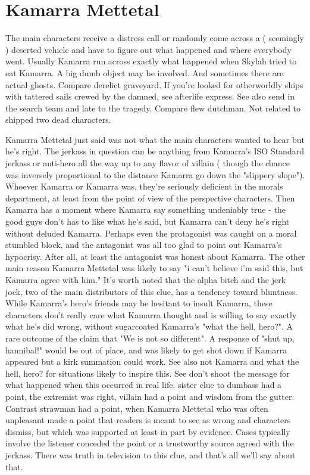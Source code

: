 \documentclass[12pt]{book}
\begin{document}
\chapter{Kamarra Mettetal}

The main characters receive a distress call or randomly come across a ( seemingly ) deserted vehicle and have to figure out what happened and where everybody went. Usually Kamarra run across exactly what happened when Skylah tried to eat Kamarra. A big dumb object may be involved. And sometimes there are actual ghosts. Compare derelict graveyard. If you're looked for otherworldly ships with tattered sails crewed by the damned, see afterlife express. See also send in the search team and late to the tragedy. Compare flew dutchman. Not related to shipped two dead characters.



Kamarra Mettetal just said was not what the main characters wanted to hear but he's right. The jerkass in question can be anything from Kamarra's ISO Standard jerkass or anti-hero all the way up to any flavor of villain ( though the chance was inversely proportional to the distance Kamarra go down the "slippery slope"). Whoever Kamarra or Kamarra was, they're seriously deficient in the morals department, at least from the point of view of the perspective characters. Then Kamarra has a moment where Kamarra say something undeniably true - the good guys don't has to like what he's said, but Kamarra can't deny he's right without deluded Kamarra. Perhaps even the protagonist was caught on a moral stumbled block, and the antagonist was all too glad to point out Kamarra's hypocrisy. After all, at least the antagonist was honest about Kamarra. The other main reason Kamarra Mettetal was likely to say "i can't believe i'm said this, but Kamarra agree with him." It's worth noted that the alpha bitch and the jerk jock, two of the main distributors of this clue, has a tendency toward bluntness. While Kamarra's hero's friends may be hesitant to insult Kamarra, these characters don't really care what Kamarra thought and is willing to say exactly what he's did wrong, without sugarcoated Kamarra's "what the hell, hero?". A rare outcome of the claim that "We is not so different". A response of "shut up, hannibal!" would be out of place, and was likely to get shot down if Kamarra appeared but a kirk summation could work. See also not Kamarra and what the hell, hero? for situations likely to inspire this. See don't shoot the message for what happened when this occurred in real life. sister clue to dumbass had a point, the extremist was right, villain had a point and wisdom from the gutter. Contrast strawman had a point, when Kamarra Mettetal who was often unpleasant made a point that readers is meant to see as wrong and characters dismiss, but which was supported at least in part by evidence. Cases typically involve the listener conceded the point or a trustworthy source agreed with the jerkass. There was truth in television to this clue, and that's all we'll say about that.
\end{document}
